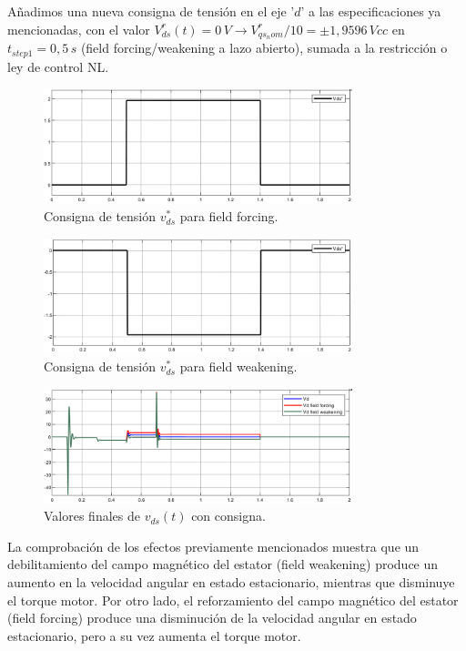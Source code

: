 \documentclass{article}
\begin{document}
Añadimos una nueva consigna de tensión en el eje '$d$' a las especificaciones ya mencionadas, con el 
valor $V^r_{ds}(t) = 0 \, V \rightarrow V^r_{qs_nom}/10 = ±1,9596 \, Vcc$ en $t_{step1} = 0,5 \, s$ 
(field forcing/weakening a lazo abierto), sumada a la restricción o ley de control NL.

\begin{figure}[H]
    \centering
    \includegraphics[width=0.8\textwidth]{5.1.6_d1.png}
    \caption{Consigna de tensión $v^*_{ds}$ para field forcing.}
\end{figure}

\begin{figure}[H]
    \centering
    \includegraphics[width=0.8\textwidth]{5.1.6_d2.png}
    \caption{Consigna de tensión $v^*_{ds}$ para field weakening.}
\end{figure}

\begin{figure}[H]
    \centering
    \includegraphics[width=0.8\textwidth]{5.1.6_d3.png}
    \caption{Valores finales de $v_{ds}(t)$ con consigna.}
\end{figure}

La comprobación de los efectos previamente mencionados muestra que un debilitamiento del campo 
magnético del estator (field weakening) produce un aumento en la velocidad angular en estado 
estacionario, mientras que disminuye el torque motor. Por otro lado, el reforzamiento del campo 
magnético del estator (field forcing) produce una disminución de la velocidad angular en estado 
estacionario, pero a su vez aumenta el torque motor.
\end{document}
